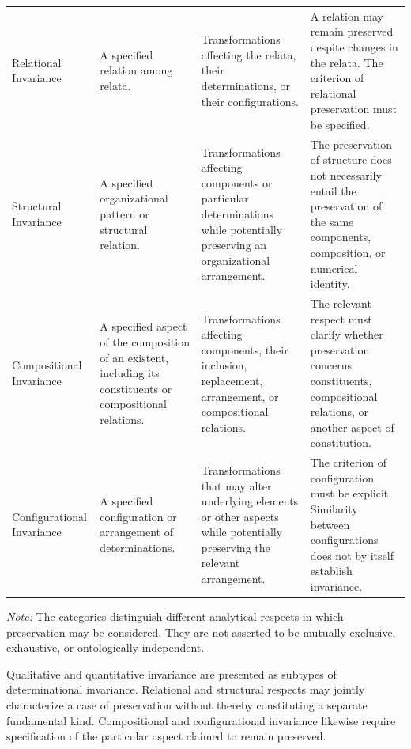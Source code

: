 \begin{center}
\begin{longtable}{
    >{\raggedright\arraybackslash}p{2.9cm}
    >{\raggedright\arraybackslash}p{3.0cm}
    >{\raggedright\arraybackslash}p{3.2cm}
    >{\raggedright\arraybackslash}p{4.4cm}
}
Relational Invariance
&
A specified relation among relata.
&
Transformations affecting the relata, their
determinations, or their configurations.
&
A relation may remain preserved despite changes
in the relata. The criterion of relational
preservation must be specified.
\\

\addlinespace

Structural Invariance
&
A specified organizational pattern or structural
relation.
&
Transformations affecting components or particular
determinations while potentially preserving
an organizational arrangement.
&
The preservation of structure does not necessarily
entail the preservation of the same components,
composition, or numerical identity.
\\

\addlinespace

Compositional Invariance
&
A specified aspect of the composition of an existent,
including its constituents or compositional relations.
&
Transformations affecting components, their
inclusion, replacement, arrangement, or
compositional relations.
&
The relevant respect must clarify whether
preservation concerns constituents, compositional
relations, or another aspect of constitution.
\\

\addlinespace

Configurational Invariance
&
A specified configuration or arrangement of
determinations.
&
Transformations that may alter underlying elements
or other aspects while potentially preserving
the relevant arrangement.
&
The criterion of configuration must be explicit.
Similarity between configurations does not by
itself establish invariance.
\\

\end{longtable}

\vspace{0.5em}

\begin{minipage}{0.95\textwidth}
\footnotesize

\textit{Note:}
The categories distinguish different analytical
respects in which preservation may be considered.
They are not asserted to be mutually exclusive,
exhaustive, or ontologically independent.

Qualitative and quantitative invariance are presented
as subtypes of determinational invariance. Relational
and structural respects may jointly characterize
a case of preservation without thereby constituting
a separate fundamental kind. Compositional and
configurational invariance likewise require
specification of the particular aspect claimed
to remain preserved.


\end{minipage}
\end{center}

